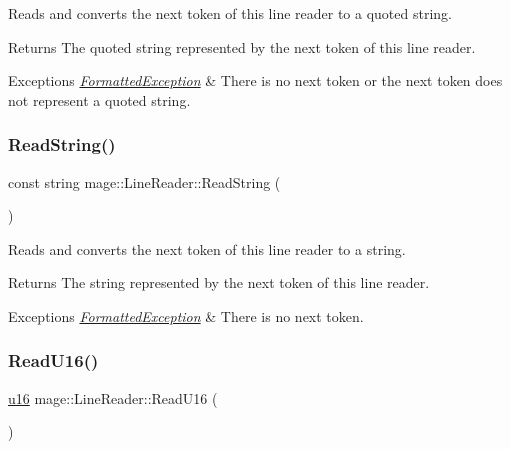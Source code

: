 Reads and converts the next token of this line reader to a quoted string.

\begin{DoxyReturn}{Returns}
The quoted string represented by the next token of this line reader. 
\end{DoxyReturn}

\begin{DoxyExceptions}{Exceptions}
{\em \hyperlink{structmage_1_1_formatted_exception}{Formatted\+Exception}} & There is no next token or the next token does not represent a quoted string. \\
\hline
\end{DoxyExceptions}
\hypertarget{classmage_1_1_line_reader_a58a27b637574ce56ea17a575aa540675}{}\label{classmage_1_1_line_reader_a58a27b637574ce56ea17a575aa540675} 
\subsubsection{\texorpdfstring{Read\+String()}{ReadString()}}
{\footnotesize\ttfamily const string mage\+::\+Line\+Reader\+::\+Read\+String (\begin{DoxyParamCaption}{ }\end{DoxyParamCaption})\hspace{0.3cm}{\ttfamily [protected]}}

Reads and converts the next token of this line reader to a string.

\begin{DoxyReturn}{Returns}
The string represented by the next token of this line reader. 
\end{DoxyReturn}

\begin{DoxyExceptions}{Exceptions}
{\em \hyperlink{structmage_1_1_formatted_exception}{Formatted\+Exception}} & There is no next token. \\
\hline
\end{DoxyExceptions}
\hypertarget{classmage_1_1_line_reader_ab8ea17802d09e6ffee185057755ad944}{}\label{classmage_1_1_line_reader_ab8ea17802d09e6ffee185057755ad944} 
\subsubsection{\texorpdfstring{Read\+U16()}{ReadU16()}}
{\footnotesize\ttfamily \hyperlink{namespacemage_aaf695d763e29d308a85ee22c6489344e}{u16} mage\+::\+Line\+Reader\+::\+Read\+U16 (\begin{DoxyParamCaption}{ }\end{DoxyParamCaption})\hspace{0.3cm}{\ttfamily [protected]}}

